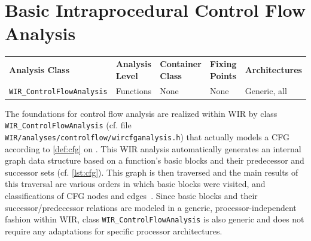 \section{Basic Intraprocedural Control Flow Analysis}
\label{sec:cflow}

\begin{tabular}{|l|l|l|l|l|}
  \hline
  \textbf{Analysis Class} & \textbf{Analysis Level} & \textbf{Container Class} & \textbf{Fixing Points} & \textbf{Architectures} \\
  \hhline{|=|=|=|=|=|}
  \texttt{\small WIR\_ControlFlowAnalysis} & Functions & None & None & Generic, all \\
  \hline
\end{tabular}

The foundations for control flow analysis are realized within \gls{WIR} by class \texttt{WIR\_ControlFlowAnalysis} (cf. file \texttt{WIR/analyses/controlflow/wircfganalysis.h}) that actually models a \gls{CFG} according to \cref{def:cfg} on .
This \gls{WIR} analysis automatically generates an internal graph data structure based on a function's basic blocks and their predecessor and successor sets (cf. \cref{lst:cfg}).
This graph is then traversed and the main results of this traversal are various orders in which basic blocks were visited, and classifications of \gls{CFG} nodes and edges~\cite[chapter~7.2]{Much97}.
Since basic blocks and their successor/predecessor relations are modeled in a generic, processor-independent fashion within \gls{WIR}, class \texttt{WIR\_ControlFlowAnalysis} is also generic and does not require any adaptations for specific processor architectures.

